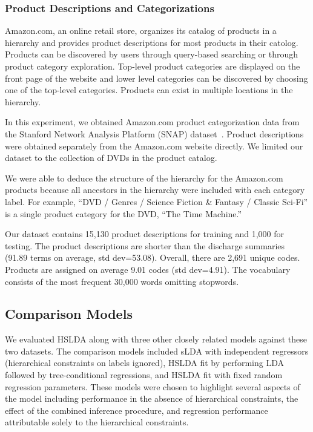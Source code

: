 \subsubsection{Product Descriptions and Categorizations}

Amazon.com, an online retail store, organizes its catalog of 
products in a hierarchy and provides product descriptions
for most products in their catolog.  Products can be discovered by users
through query-based searching or through product category exploration. Top-level
product categories are displayed on the front page of the website and lower
level categories can be discovered by choosing one of the top-level categories.
Products can exist in multiple locations in the hierarchy.

In this experiment, we obtained Amazon.com product categorization data from 
the Stanford Network Analysis Platform (SNAP) dataset~\citep{SNAP}. 
Product descriptions were obtained separately from the
Amazon.com website directly. We limited our dataset to the collection of DVDs
in the product catalog.

We were able to deduce the structure of the
hierarchy for the Amazon.com products because all ancestors in the
hierarchy were included with each category label. For example, {}``DVD / Genres
/ Science Fiction \& Fantasy / Classic Sci-Fi'' is a single product category 
for the DVD, {}``The Time Machine.''

Our dataset contains 15,130 product descriptions for training and 1,000
for testing. The product descriptions are shorter than the discharge summaries
(91.89 terms on average, std dev=53.08). Overall, there are 2,691 unique codes.
Products are assigned on average 9.01 codes (std dev=4.91). The vocabulary
consists of the most frequent 30,000 words omitting stopwords. 

\subsection{Comparison Models}

We evaluated HSLDA along with three other closely related models against 
these two datasets. The comparison models included sLDA with independent 
regressors (hierarchical constraints on labels ignored), HSLDA fit by 
performing LDA followed by tree-conditional regressions, and HSLDA fit 
with fixed random regression parameters. These models were chosen to 
highlight several aspects of the model including performance in the absence 
of hierarchical constraints, the effect of the combined inference procedure, and regression
performance attributable solely to the hierarchical constraints.

